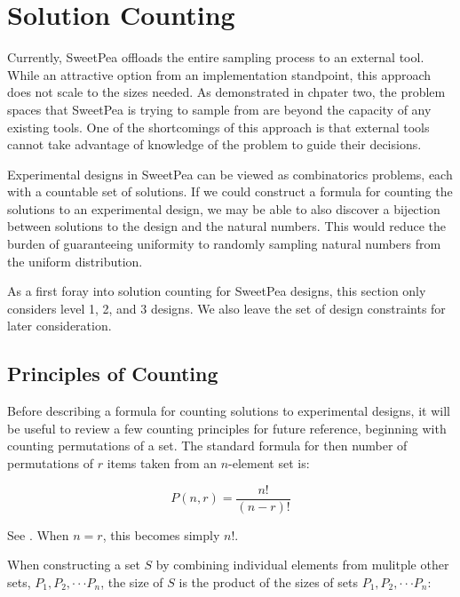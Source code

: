 
\chapter{Solution Counting}

Currently, SweetPea offloads the entire sampling process to an external tool. While an attractive option from an implementation standpoint, this approach does not scale to the sizes needed. As demonstrated in chpater two, the problem spaces that SweetPea is trying to sample from are beyond the capacity of any existing tools. One of the shortcomings of this approach is that external tools cannot take advantage of knowledge of the problem to guide their decisions.

Experimental designs in SweetPea can be viewed as combinatorics problems, each with a countable set of solutions. If we could construct a formula for counting the solutions to an experimental design, we may be able to also discover a bijection between solutions to the design and the natural numbers. This would reduce the burden of guaranteeing uniformity to randomly sampling natural numbers from the uniform distribution.

As a first foray into solution counting for SweetPea designs, this section only considers level 1, 2, and 3 designs. We also leave the set of design constraints for later consideration.


\section{Principles of Counting}

Before describing a formula for counting solutions to experimental designs, it will be useful to review a few counting principles for future reference, beginning with counting permutations of a set. The standard formula for then number of permutations of $r$ items taken from an $n$-element set is:

\[
P(n,r) = \frac{n!}{(n-r)!}
\]

See \cite{brualdi_introductory_2010}. When $n =  r$, this becomes simply $n!$.



When constructing a set $S$ by combining individual elements from mulitple other sets, $P_1, P_2, \cdot\cdot\cdot P_n$, the size of $S$ is the product of the sizes of sets $P_1, P_2, \cdot\cdot\cdot P_n$:

